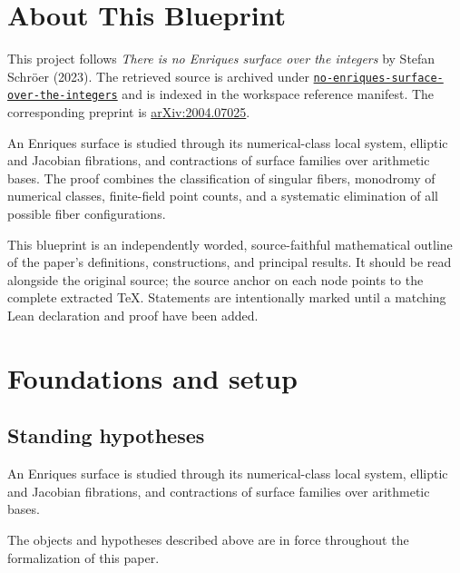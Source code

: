 

\chapter*{About This Blueprint}
\label{no-enriques-surface-over-the-integers-about}

This project follows \emph{There is no Enriques surface over the integers} by Stefan Schröer (2023). The
retrieved source is archived under
\href{../../../../../references/no-enriques-surface-over-the-integers/}{\texttt{no-enriques-surface-over-the-integers}} and is indexed in
the workspace reference manifest. The corresponding preprint is
\href{https://arxiv.org/abs/2004.07025}{arXiv:2004.07025}.

An Enriques surface is studied through its numerical-class local system, elliptic and Jacobian fibrations, and contractions of surface families over arithmetic bases. The proof combines the classification of singular fibers, monodromy of numerical classes, finite-field point counts, and a systematic elimination of all possible fiber configurations.

This blueprint is an independently worded, source-faithful mathematical
outline of the paper's definitions, constructions, and principal results. It
should be read alongside the original source; the source anchor on each node
points to the complete extracted TeX. Statements are intentionally marked
\notready until a matching Lean declaration and proof have been added.

\chapter{Foundations and setup}
\label{chap:no-enriques-surface-over-the-integers-foundations}

\section{Standing hypotheses}
\label{sec:no-enriques-surface-over-the-integers-standing}

An Enriques surface is studied through its numerical-class local system, elliptic and Jacobian fibrations, and contractions of surface families over arithmetic bases.

\begin{convention}
\label{no-enriques-surface-over-the-integers-setup}
The objects and hypotheses described above are in force throughout the
formalization of this paper.
\notready
\end{convention}

